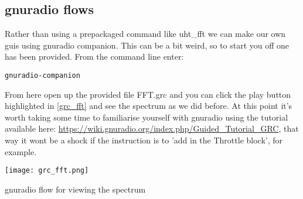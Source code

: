 \subsection{gnuradio flows}
Rather than using a prepackaged command like uht\_fft we can make our own \gls{gui}s using gnuradio companion. This can be a bit weird, so to start you off one has been provided. From the command line enter:
\begin{lstlisting}
gnuradio-companion 
\end{lstlisting}
From here open up the provided file FFT.grc and you can click the play button highlighted in \cref{grc_fft} and see the spectrum as we did before. At this point it's worth taking some time to familiarise yourself with gnuradio using the tutorial available here: \url{https://wiki.gnuradio.org/index.php/Guided\_Tutorial\_GRC}, that way it wont be a shock if the instruction is to 'add in the Throttle block', for example.

\centrefigurestart
\texttt{[image: grc\_fft.png]}
\caption{gnuradio flow for viewing the spectrum}
\label{grc_fft}
\centrefigureend